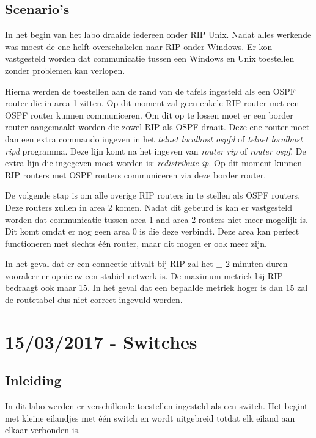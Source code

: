 \documentclass{report}
\begin{document}
\section{Scenario's}
In het begin van het labo draaide iedereen onder RIP Unix. Nadat alles werkende was moest de ene helft overschakelen naar RIP onder Windows. Er kon vastgesteld worden dat communicatie tussen een Windows en Unix toestellen zonder problemen kan verlopen.

Hierna werden de toestellen aan de rand van de tafels ingesteld als een OSPF router die in area 1 zitten. Op dit moment zal geen enkele RIP router met een OSPF router kunnen communiceren. Om dit op te lossen moet er een border router aangemaakt worden die zowel RIP als OSPF draait. Deze ene router moet dan een extra commando ingeven in het \textit{telnet localhost ospfd} of \textit{telnet localhost ripd} programma. Deze lijn komt na het ingeven van \textit{router rip} of \textit{router ospf}. De extra lijn die ingegeven moet worden is: \textit{redistribute ip}. Op dit moment kunnen RIP routers met OSPF routers communiceren via deze border router.

De volgende stap is om alle overige RIP routers in te stellen als OSPF routers. Deze routers zullen in area 2 komen. Nadat dit gebeurd is kan er vastgesteld worden dat communicatie tussen area 1 and area 2 routers niet meer mogelijk is. Dit komt omdat er nog geen area 0 is die deze verbindt. Deze area kan perfect functioneren met slechts één router, maar dit mogen er ook meer zijn.

In het geval dat er een connectie uitvalt bij RIP zal het $\pm$ 2 minuten duren vooraleer er opnieuw een stabiel netwerk is. De maximum metriek bij RIP bedraagt ook maar 15. In het geval dat een bepaalde metriek hoger is dan 15 zal de routetabel dus niet correct ingevuld worden.


\chapter{15/03/2017 - Switches}
\section{Inleiding}
In dit labo werden er verschillende toestellen ingesteld als een switch. Het begint met kleine eilandjes met één switch en wordt uitgebreid totdat elk eiland aan elkaar verbonden is.
\end{document}
